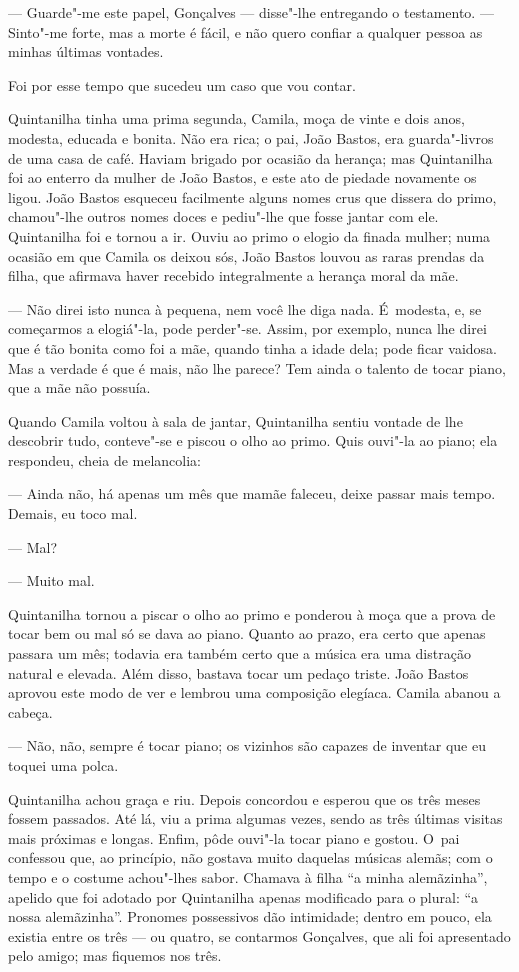 \begin{linenumbers}
--- Guarde"-me este papel, Gonçalves --- disse"-lhe entregando o testamento.
--- Sinto"-me forte, mas a morte é fácil, e não quero confiar a qualquer
pessoa as minhas últimas vontades.

Foi por esse tempo que sucedeu um caso que vou contar.

Quintanilha tinha uma prima segunda, Camila, moça de vinte e dois anos,
modesta, educada e bonita. Não era rica; o pai, João Bastos, era
guarda"-livros de uma casa de café. Haviam brigado por ocasião da
herança; mas Quintanilha foi ao enterro da mulher de João Bastos, e este
ato de piedade novamente os ligou. João Bastos esqueceu facilmente
alguns nomes crus que dissera do primo, chamou"-lhe outros nomes doces e
pediu"-lhe que fosse jantar com ele. Quintanilha foi e tornou a ir. Ouviu
ao primo o elogio da finada mulher; numa ocasião em que Camila os deixou
sós, João Bastos louvou as raras prendas da filha, que afirmava haver
recebido integralmente a herança moral da mãe.

--- Não direi isto nunca à pequena, nem você lhe diga nada. É~modesta, e,
se começarmos a elogiá"-la, pode perder"-se. Assim, por exemplo, nunca lhe
direi que é tão bonita como foi a mãe, quando tinha a idade dela; pode
ficar vaidosa. Mas a verdade é que é mais, não lhe parece? Tem ainda o
talento de tocar piano, que a mãe não possuía.

Quando Camila voltou à sala de jantar, Quintanilha sentiu vontade de lhe
descobrir tudo, conteve"-se e piscou o olho ao primo. Quis ouvi"-la ao
piano; ela respondeu, cheia de melancolia:

--- Ainda não, há apenas um mês que mamãe faleceu, deixe passar mais
tempo. Demais, eu toco mal.

--- Mal?

--- Muito mal.

Quintanilha tornou a piscar o olho ao primo e ponderou à moça que a
prova de tocar bem ou mal só se dava ao piano. Quanto ao prazo, era
certo que apenas passara um mês; todavia era também certo que a música
era uma distração natural e elevada. Além disso, bastava tocar um pedaço
triste. João Bastos aprovou este modo de ver e lembrou uma composição
elegíaca. Camila abanou a cabeça.

--- Não, não, sempre é tocar piano; os vizinhos são capazes de inventar
que eu toquei uma polca.

Quintanilha achou graça e riu. Depois concordou e esperou que os três
meses fossem passados. Até lá, viu a prima algumas vezes, sendo as três
últimas visitas mais próximas e longas. Enfim, pôde ouvi"-la tocar piano
e gostou. O~pai confessou que, ao princípio, não gostava muito daquelas
músicas alemãs; com o tempo e o costume achou"-lhes sabor. Chamava à
filha ``a minha alemãzinha'', apelido que foi adotado por Quintanilha
apenas modificado para o plural: ``a nossa alemãzinha''. Pronomes
possessivos dão intimidade; dentro em pouco, ela existia entre os três
--- ou quatro, se contarmos Gonçalves, que ali foi apresentado pelo
amigo; mas fiquemos nos três.


\end{linenumbers}
